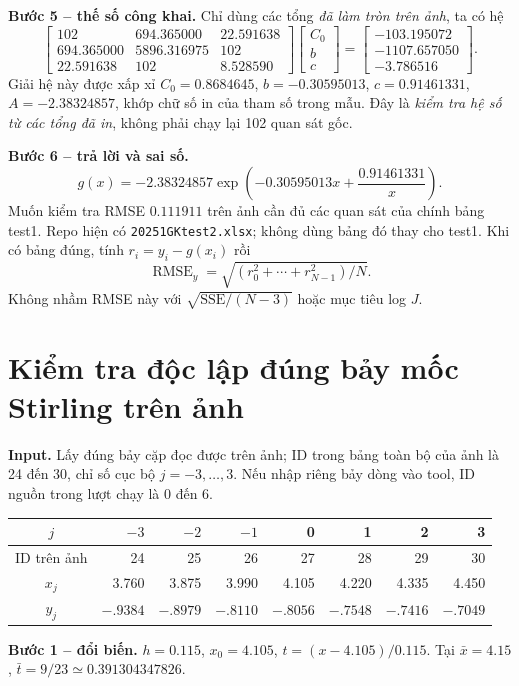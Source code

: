 \textbf{Bước 5 -- thế số công khai.} Chỉ dùng các tổng \emph{đã làm tròn trên ảnh}, ta có hệ
\[
\begin{bmatrix}
102&694.365000&22.591638\\
694.365000&5896.316975&102\\
22.591638&102&8.528590
\end{bmatrix}
\begin{bmatrix}C_0\\b\\c\end{bmatrix}
=\begin{bmatrix}-103.195072\\-1107.657050\\-3.786516\end{bmatrix}.
\]
Giải hệ này được xấp xỉ $C_0=0.8684645$, $b=-0.30595013$, $c=0.91461331$,
$A=-2.38324857$, khớp chữ số in của tham số trong mẫu.
Đây là \emph{kiểm tra hệ số từ các tổng đã in}, không phải chạy lại 102 quan sát gốc.

\textbf{Bước 6 -- trả lời và sai số.}
\[
g(x)=-2.38324857\exp\left(-0.30595013x+\frac{0.91461331}{x}\right).
\]
Muốn kiểm tra RMSE $0.111911$ trên ảnh cần đủ các quan sát của chính bảng test1.
Repo hiện có \texttt{20251GKtest2.xlsx}; không dùng bảng đó thay cho test1.
Khi có bảng đúng, tính $r_i=y_i-g(x_i)$ rồi
\[
\operatorname{RMSE}_y=\sqrt{(r_0^2+\cdots+r_{N-1}^2)/N}.
\]
Không nhầm RMSE này với $\sqrt{\mathrm{SSE}/(N-3)}$ hoặc mục tiêu log $J$.

\section{Kiểm tra độc lập đúng bảy mốc Stirling trên ảnh}
\textbf{Input.} Lấy đúng bảy cặp đọc được trên ảnh; ID trong bảng toàn bộ của ảnh là 24 đến 30, chỉ số cục bộ $j=-3,\ldots,3$.
Nếu nhập riêng bảy dòng vào tool, ID nguồn trong lượt chạy là 0 đến 6.
\begin{center}\small
\begin{tabular}{crrrrrrr}\toprule
$j$&$-3$&$-2$&$-1$&0&1&2&3\\\midrule
ID trên ảnh&24&25&26&27&28&29&30\\
$x_j$&3.760&3.875&3.990&4.105&4.220&4.335&4.450\\
$y_j$&$-.9384$&$-.8979$&$-.8110$&$-.8056$&$-.7548$&$-.7416$&$-.7049$\\\bottomrule
\end{tabular}\end{center}
\textbf{Bước 1 -- đổi biến.}
$h=0.115$, $x_0=4.105$, $t=(x-4.105)/0.115$.
Tại $\bar x=4.15$, $\bar t=9/23\simeq0.391304347826$.

